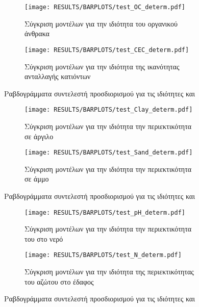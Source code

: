 \begin{figure}[H]
    \begin{subfigure}{0.5\textwidth}
        \texttt{[image: RESULTS/BARPLOTS/test\_OC\_determ.pdf]}
        \caption{Σύγκριση μοντέλων για την ιδιότητα του οργανικού άνθρακα}
        \label{fig:OC_determ}
    \end{subfigure}
    \begin{subfigure}{0.5\textwidth}
        \texttt{[image: RESULTS/BARPLOTS/test\_CEC\_determ.pdf]}
        \caption{Σύγκριση μοντέλων για την ιδιότητα της ικανότητας ανταλλαγής κατιόντων}
        \label{fig:CEC_determ}
    \end{subfigure}
    \caption{Ραβδογράμματα συντελεστή προσδιορισμού για τις ιδιότητες  και }
\end{figure}
\begin{figure}[H]
    \begin{subfigure}{0.5\textwidth}
        \texttt{[image: RESULTS/BARPLOTS/test\_Clay\_determ.pdf]}
        \caption{Σύγκριση μοντέλων για την ιδιότητα την περιεκτικότητα σε άργιλο}
        \label{fig:Clay_determ}
    \end{subfigure}
    \begin{subfigure}{0.5\textwidth}
        \texttt{[image: RESULTS/BARPLOTS/test\_Sand\_determ.pdf]}
        \caption{Σύγκριση μοντέλων για την ιδιότητα την περιεκτικότητα σε άμμο}
        \label{fig:Sand_determ}
    \end{subfigure}
    \caption{Ραβδογράμματα συντελεστή προσδιορισμού για τις ιδιότητες  και }
\end{figure}
\begin{figure}[H]
    \begin{subfigure}{0.5\textwidth}
        \texttt{[image: RESULTS/BARPLOTS/test\_pH\_determ.pdf]}
        \caption{Σύγκριση μοντέλων για την ιδιότητα την περιεκτικότητα του  στο νερό}
        \label{fig:pH_determ}
    \end{subfigure}
    \begin{subfigure}{0.5\textwidth}
        \texttt{[image: RESULTS/BARPLOTS/test\_N\_determ.pdf]}
        \caption{Σύγκριση μοντέλων για την ιδιότητα της περιεκτικότητας του αζώτου στο έδαφος}
        \label{fig:N_determ}
    \end{subfigure}
    \caption{Ραβδογράμματα συντελεστή προσδιορισμού για τις ιδιότητες  και }
\end{figure}

